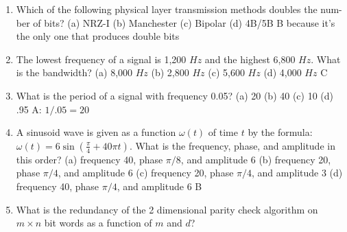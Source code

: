 \documentclass{article}
\begin{document}
    \begin{enumerate}
        \item Which of the following physical layer transmission methods doubles the num-ber of bits?
            \newline
            (a) NRZ-I
            \newline
            (b) Manchester
            \newline
            (c) Bipolar
            \newline
            (d) 4B/5B
            \newline
            B because it's the only one that produces double bits
        \item The lowest frequency of a signal is 1,200 $Hz$ and the highest 6,800 $Hz$. What is the bandwidth?
            \newline
            (a) 8,000 $Hz$
            \newline
            (b) 2,800 $Hz$
            \newline
            (c) 5,600 $Hz$
            \newline
            (d) 4,000 $Hz$
            \newline
            C
        \item What is the period of a signal with frequency 0.05?
            \newline
            (a) 20
            \newline
            (b) 40
            \newline
            (c) 10
            \newline
            (d) .95
            \newline
            A: $1/.05 = 20$
        \item A sinusoid wave is given as a function $\omega(t)$ of time $t$ by the formula: $\omega(t) = 6\sin(\frac{\pi}{4} + 40\pi t)$. What is the frequency, phase, and amplitude in this order?
            \newline
            (a) frequency 40, phase $\pi/8$, and amplitude 6
            \newline
            (b) frequency 20, phase $\pi/4$, and amplitude 6
            \newline
            (c) frequency 20, phase $\pi/4$, and amplitude 3
            \newline
            (d) frequency 40, phase $\pi/4$, and amplitude 6
            \newline
            B
        \item What is the redundancy of the 2 dimensional parity check algorithm on $m \times n$ bit words as a function of $m$ and $d$?

\end{enumerate}
\end{document}

